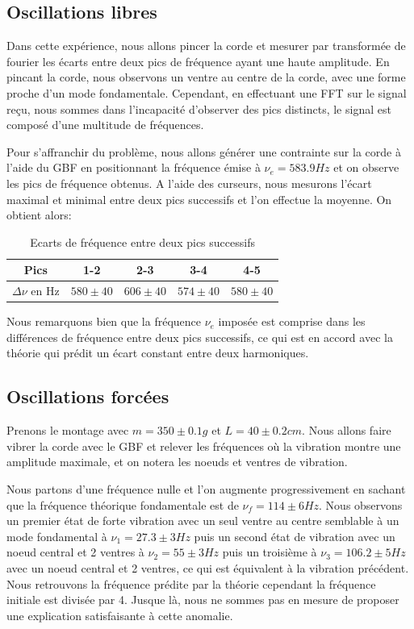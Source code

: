 \documentclass[12pt]{article}
\begin{document}
\subsection{Oscillations libres}
Dans cette expérience, nous allons pincer la corde et mesurer par transformée de fourier les écarts entre deux pics de fréquence ayant une haute amplitude.
En pincant la corde, nous observons un ventre au centre de la corde, avec une forme proche d'un mode fondamentale. Cependant, en effectuant une FFT sur le signal reçu,
nous sommes dans l'incapacité d'observer des pics distincts, le signal est composé d'une multitude de fréquences.

Pour s'affranchir du problème, nous allons générer une contrainte sur la corde à l'aide du GBF en positionnant la fréquence émise à $\nu_e = 583.9 Hz$ et on observe
les pics de fréquence obtenus. A l'aide des curseurs, nous mesurons l'écart maximal et minimal entre deux pics successifs et l'on effectue la moyenne. On obtient alors:

\begin{table}[h!]
	\centering
	\begin{tabular}{||c c c c c||} 
		\hline
		Pics & 1-2 & 2-3 & 3-4 & 4-5 \\
		\hline
        $\Delta \nu$ en Hz & $580 \pm 40$ & $606 \pm 40$ & $574 \pm 40$ & $580 \pm 40$ \\
		\hline
	\end{tabular}
	\caption{Ecarts de fréquence entre deux pics successifs}
	\label{table:1}
\end{table}

Nous remarquons bien que la fréquence $\nu_e$ imposée est comprise dans les différences de fréquence entre deux pics successifs, ce qui est en accord avec la théorie qui prédit 
un écart constant entre deux harmoniques.

\break
\subsection{Oscillations forcées}
Prenons le montage avec $m=350 \pm 0.1g$ et $L=40 \pm 0.2cm$. Nous allons faire vibrer la corde avec le GBF et relever les fréquences où la vibration montre une amplitude
maximale, et on notera les noeuds et ventres de vibration.

Nous partons d'une fréquence nulle et l'on augmente progressivement en sachant que la fréquence théorique fondamentale est de $\nu_f = 114 \pm 6 Hz$.
Nous observons un premier état de forte vibration avec un seul ventre au centre semblable à un mode fondamental à $\nu_1 = 27.3 \pm 3 Hz$ puis un second état 
de vibration avec un noeud central et 2 ventres à $\nu_2 = 55 \pm 3 Hz$ puis un troisième à $\nu_3 = 106.2 \pm 5Hz$ avec un noeud central et 2 ventres, ce qui est équivalent à la vibration
précédent. Nous retrouvons la fréquence prédite par la théorie cependant la fréquence initiale est divisée par 4. Jusque là, nous ne sommes pas en mesure de proposer une explication
satisfaisante à cette anomalie.
\end{document}

